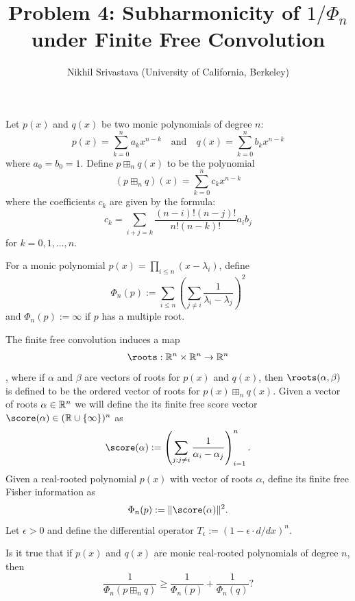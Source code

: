 

\title{Problem 4: Subharmonicity of $1/\Phi_n$ under Finite Free Convolution}
\author{Nikhil Srivastava (University of California, Berkeley)}
\date{}


\maketitle

Let $p(x)$ and $q(x)$ be two monic polynomials of degree $n$:
\[
p(x) = \sum_{k=0}^n a_k x^{n-k} \quad \text{and} \quad q(x) = \sum_{k=0}^n b_k x^{n-k}
\]
where $a_0 = b_0 = 1$. Define $p \boxplus_n q(x)$ to be the polynomial
\[
(p \boxplus_n q)(x) = \sum_{k=0}^n c_k x^{n-k}
\]
where the coefficients $c_k$ are given by the formula:
\[
c_k = \sum_{i+j=k} \frac{(n-i)! (n-j)!}{n! (n-k)!} a_i b_j
\]
for $k = 0, 1, \dots, n$.

For a monic polynomial $p(x)=\prod_{i\le n}(x- \lambda_i)$, define
$$\Phi_n(p):=\sum_{i\le n}\left(\sum_{j\neq i} \frac{1}{\lambda_i-\lambda_j}\right)^2$$
and $\Phi_n(p):=\infty$ if $p$ has a multiple root.

The finite free convolution induces a map $$\roots: \bR^{n}\times \bR^n \to \bR^n$$, where if $\alpha$ and $\beta$ are vectors of roots for $p(x)$ and $q(x)$, then $\roots(\alpha, \beta)$ is defined to be the ordered vector of roots for $p(x)\boxplus_n q(x)$.
Given a vector of roots $\alpha\in \mathbb{R}^n$ we will define the its finite free score vector $\score(\alpha) \in (\bR\cup\{\infty\})^n$ as 
$$\score(\alpha) := \left( \sum_{j : j \neq i} \frac{1}{\alpha_i-\alpha_j} \right)_{i=1}^n. $$ Given a real-rooted polynomial $p(x)$ with vector of roots $\alpha$, define its finite free Fisher information as 
$$\Phi_n(p) := \|\score(\alpha)\|^2.$$  Let $\epsilon>0$ and define the differential operator $T_\epsilon:=(1-\epsilon \cdot d/dx)^n$.

Is it true that if $p(x)$ and $q(x)$ are monic real-rooted polynomials of degree $n$, then
$$\frac{1}{\Phi_n(p\boxplus_n q)} \ge \frac{1}{\Phi_n(p)}+\frac{1}{\Phi_n(q)}?$$



